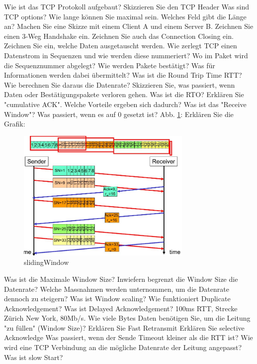 \documentclass[ngerman,a4paper,12pt]{scrreprt}
\begin{document}
\olR
	\li Wie ist das TCP Protokoll aufgebaut? Skizzieren Sie den TCP Header
	\li Was sind TCP options? Wie lange können Sie maximal sein. Welches Feld gibt die Länge an?
	\li Machen Sie eine Skizze mit einem Client A und einem Server B. Zeichnen Sie einen 3-Weg Handshake ein. Zeichnen Sie auch das Connection Closing ein. Zeichnen Sie ein, welche Daten ausgetauscht werden.
	\li Wie zerlegt TCP einen Datenstrom in Sequenzen und wie werden diese nummeriert? Wo im Paket wird die Sequenznummer abgelegt?
	 \li Wie werden Pakete bestätigt? Was für Informationen werden dabei übermittelt?
	 \li Was ist die Round Trip Time RTT? Wie berechnen Sie daraus die Datenrate?
	 \li Skizzieren Sie, was passiert, wenn Daten oder Bestätigungspakete verloren gehen. Was ist die RTO?
	 \li Erklären Sie "cumulative ACK". Welche Vorteile ergeben sich dadurch?
	 \li Was ist das "Receive Window"? Was passiert, wenn es auf 0 gesetzt ist?
	 \li Abb. \ref{slidingWindow}: Erklären Sie die Grafik:	 
		\begin{figure}[H]
			\centering
			\includegraphics[width=0.75\textwidth]{img/V11.19.jpg}
			\caption{slidingWindow}
			\label{slidingWindow}
		\end{figure}
	\li Was ist die Maximale Window Size? Inwiefern begrenzt die Window Size die Datenrate?
	\li Welche Massnahmen werden unternommen, um die Datenrate dennoch zu steigern?
	\li Was ist Window scaling?
	\li Wie funktioniert Duplicate Acknowledgement?
	\li Was ist Delayed Acknowledgement?
	\li 100ms RTT, Strecke Zürich New York, 80Mb/s. Wie viele Bytes Daten benötigen Sie, um die Leitung "zu füllen" (Window Size)?
	\li Erklären Sie Fast Retransmit
	\li Erklären Sie selective Acknowledge
	\li Was passiert, wenn der Sende Timeout kleiner als die RTT ist?
	\li Wie wird eine TCP Verbindung an die mögliche Datenrate der Leitung angepasst? Was ist slow Start?
\olS
\end{document}
